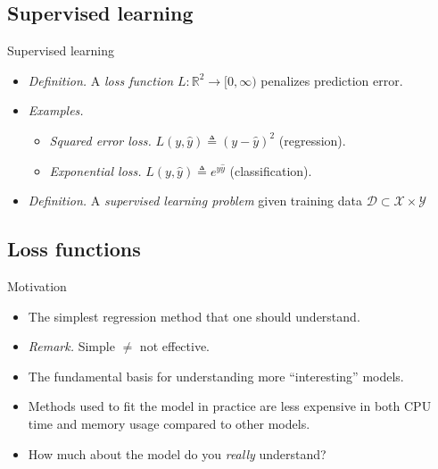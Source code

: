 \documentclass{beamer}
\numberwithin{equation}{section}
\begin{document}
\subsection{Supervised learning}

\begin{frame}{Supervised learning}
    \begin{itemize}
        \item
        \textit{Definition.} A \textit{loss function} $ L : \mathbb{R}^2
        \rightarrow [0, \infty) $ penalizes prediction error.

        \item
        \textit{Examples.}
        \begin{itemize}
            \item
            \textit{Squared error loss.} $ L(y, \hat{y}) \triangleq
            (y - \hat{y})^2 $ (regression).

            \item
            \textit{Exponential loss.} $ L(y, \hat{y}) \triangleq
            e^{y\hat{y}} $ (classification).
        \end{itemize}
        \item
        \textit{Definition.} A \textit{supervised learning problem} given
        training data $ \mathcal{D} \subset \mathcal{X} \times \mathcal{Y} $
    \end{itemize}
\end{frame}

\subsection{Loss functions}

\begin{frame}{Motivation}
    \begin{itemize}
        \item
        The simplest\footnotemark{} regression method that one should understand.

        \item
        \textit{Remark.} Simple $ \ne $ not effective.

        \item
        The fundamental basis for understanding more ``interesting'' models.

        \item
        Methods used to fit the model in practice are less expensive in both
        CPU time and memory usage compared to other models.

        \item
        How much about the model do you \textit{really} understand?
    \end{itemize}
\end{frame}
\end{document}
